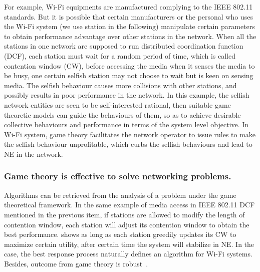 For example, Wi-Fi equipments are manufactured complying to the IEEE 802.11 standards.
But it is possible that certain manufacturers or the personal who uses the Wi-Fi system (we use station in the following) manipulate certain parameters to obtain performance advantage over other stations in the network.
When all the stations in one network are supposed to run distributed coordination function (\gls{DCF}), \ie each station must wait for a random period of time, which is called contention window (\gls{CW}), before accessing the media when it senses the media to be busy, one certain selfish station may not choose to wait but is keen on sensing media.
The selfish behaviour causes more collisions with other stations, and possibly results in poor performance in the network.
In this example, the selfish network entities are seen to be self-interested rational, then suitable game theoretic models can guide the behaviours of them, so as to achieve desirable collective behaviours and performance in terms of the system level objective.
In Wi-Fi system, game theory facilitates the network operator to issue rules to make the selfish behaviour unprofitable, which curbs the selfish behaviours and lead to NE in the network.

\subsubsection{Game theory is effective to solve networking problems.}
Algorithms can be retrieved from the analysis of a problem under the game theoretical framework.
In the same example of media access in IEEE 802.11 DCF mentioned in the previous item, if stations are allowed to modify the length of contention window, each station will adjust its contention window to obtain the best performance.
\cite{contentiongame_07} shows as long as each station greedily updates its CW to maximize certain utility, after certain time the system will stabilize in NE. 
In the case, the best response process naturally defines an algorithm for Wi-Fi systems.
%
Besides, outcome from game theory is robust~\cite{Han:2008:RAW:1457343}.


